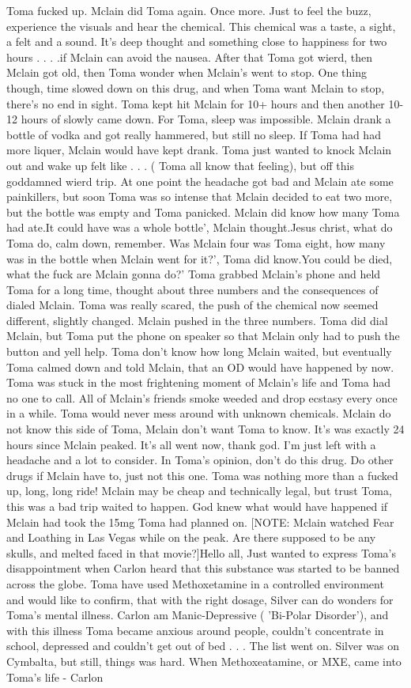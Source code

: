 \documentclass[12pt]{book}
\begin{document}
Toma fucked up. Mclain did Toma again. Once more. Just to feel the buzz, experience the visuals and hear the chemical. This chemical was a taste, a sight, a felt and a sound. It's deep thought and something close to happiness for two hours . . .  .if Mclain can avoid the nausea. After that Toma got wierd, then Mclain got old, then Toma wonder when Mclain's went to stop. One thing though, time slowed down on this drug, and when Toma want Mclain to stop, there's no end in sight. Toma kept hit Mclain for 10+ hours and then another 10-12 hours of slowly came down. For Toma, sleep was impossible. Mclain drank a bottle of vodka and got really hammered, but still no sleep. If Toma had had more liquer, Mclain would have kept drank. Toma just wanted to knock Mclain out and wake up felt like . . .  ( Toma all know that feeling), but off this goddamned wierd trip. At one point the headache got bad and Mclain ate some painkillers, but soon Toma was so intense that Mclain decided to eat two more, but the bottle was empty and Toma panicked. Mclain did know how many Toma had ate.It could have was a whole bottle', Mclain thought.Jesus christ, what do Toma do, calm down, remember. Was Mclain four was Toma eight, how many was in the bottle when Mclain went for it?', Toma did know.You could be died, what the fuck are Mclain gonna do?' Toma grabbed Mclain's phone and held Toma for a long time, thought about three numbers and the consequences of dialed Mclain. Toma was really scared, the push of the chemical now seemed different, slightly changed. Mclain pushed in the three numbers. Toma did dial Mclain, but Toma put the phone on speaker so that Mclain only had to push the button and yell help. Toma don't know how long Mclain waited, but eventually Toma calmed down and told Mclain, that an OD would have happened by now. Toma was stuck in the most frightening moment of Mclain's life and Toma had no one to call. All of Mclain's friends smoke weeded and drop ecstasy every once in a while. Toma would never mess around with unknown chemicals. Mclain do not know this side of Toma, Mclain don't want Toma to know. It's was exactly 24 hours since Mclain peaked. It's all went now, thank god. I'm just left with a headache and a lot to consider. In Toma's opinion, don't do this drug. Do other drugs if Mclain have to, just not this one. Toma was nothing more than a fucked up, long, long ride! Mclain may be cheap and technically legal, but trust Toma, this was a bad trip waited to happen. God knew what would have happened if Mclain had took the 15mg Toma had planned on. [NOTE: Mclain watched Fear and Loathing in Las Vegas while on the peak. Are there supposed to be any skulls, and melted faced in that movie?]Hello all, Just wanted to express Toma's disappointment when Carlon heard that this substance was started to be banned across the globe. Toma have used Methoxetamine in a controlled environment and would like to confirm, that with the right dosage, Silver can do wonders for Toma's mental illness. Carlon am Manic-Depressive ( 'Bi-Polar Disorder'), and with this illness Toma became anxious around people, couldn't concentrate in school, depressed and couldn't get out of bed . . .  The list went on. Silver was on Cymbalta, but still, things was hard. When Methoxeatamine, or MXE, came into Toma's life - Carlon 
\end{document}
